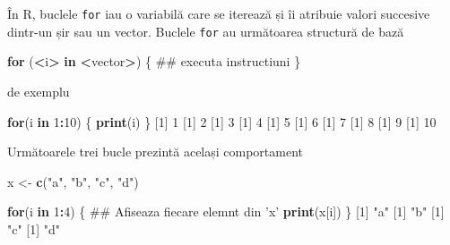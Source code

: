 \documentclass[]{article}
\newenvironment{Shaded}{\begin{snugshade}}{\end{snugshade}}
\newcommand{\KeywordTok}[1]{\textcolor[rgb]{0.13,0.29,0.53}{\textbf{#1}}}
\newcommand{\DecValTok}[1]{\textcolor[rgb]{0.00,0.00,0.81}{#1}}
\newcommand{\StringTok}[1]{\textcolor[rgb]{0.31,0.60,0.02}{#1}}
\newcommand{\ControlFlowTok}[1]{\textcolor[rgb]{0.13,0.29,0.53}{\textbf{#1}}}
\newcommand{\OperatorTok}[1]{\textcolor[rgb]{0.81,0.36,0.00}{\textbf{#1}}}
\newcommand{\NormalTok}[1]{#1}
\begin{document}
În R, buclele \texttt{for} iau o variabilă care se iterează și îi
atribuie valori succesive dintr-un șir sau un vector. Buclele
\texttt{for} au următoarea structură de bază

\begin{Shaded}
\begin{Highlighting}[]
\ControlFlowTok{for}\NormalTok{ (}\OperatorTok{<}\NormalTok{i}\OperatorTok{>}\StringTok{ }\ControlFlowTok{in} \OperatorTok{<}\NormalTok{vector}\OperatorTok{>}\NormalTok{) \{}
\NormalTok{        ## executa instructiuni}
\NormalTok{\} }
\end{Highlighting}
\end{Shaded}

de exemplu

\begin{Shaded}
\begin{Highlighting}[]
\ControlFlowTok{for}\NormalTok{(i }\ControlFlowTok{in} \DecValTok{1}\OperatorTok{:}\DecValTok{10}\NormalTok{) \{}
        \KeywordTok{print}\NormalTok{(i)}
\NormalTok{\}}
\NormalTok{[}\DecValTok{1}\NormalTok{] }\DecValTok{1}
\NormalTok{[}\DecValTok{1}\NormalTok{] }\DecValTok{2}
\NormalTok{[}\DecValTok{1}\NormalTok{] }\DecValTok{3}
\NormalTok{[}\DecValTok{1}\NormalTok{] }\DecValTok{4}
\NormalTok{[}\DecValTok{1}\NormalTok{] }\DecValTok{5}
\NormalTok{[}\DecValTok{1}\NormalTok{] }\DecValTok{6}
\NormalTok{[}\DecValTok{1}\NormalTok{] }\DecValTok{7}
\NormalTok{[}\DecValTok{1}\NormalTok{] }\DecValTok{8}
\NormalTok{[}\DecValTok{1}\NormalTok{] }\DecValTok{9}
\NormalTok{[}\DecValTok{1}\NormalTok{] }\DecValTok{10}
\end{Highlighting}
\end{Shaded}

Următoarele trei bucle prezintă același comportament

\begin{Shaded}
\begin{Highlighting}[]
\NormalTok{x <-}\StringTok{ }\KeywordTok{c}\NormalTok{(}\StringTok{"a"}\NormalTok{, }\StringTok{"b"}\NormalTok{, }\StringTok{"c"}\NormalTok{, }\StringTok{"d"}\NormalTok{)}

\ControlFlowTok{for}\NormalTok{(i }\ControlFlowTok{in} \DecValTok{1}\OperatorTok{:}\DecValTok{4}\NormalTok{) \{}
\NormalTok{        ## Afiseaza fiecare elemnt din 'x'}
        \KeywordTok{print}\NormalTok{(x[i])  }
\NormalTok{\}}
\NormalTok{[}\DecValTok{1}\NormalTok{] }\StringTok{"a"}
\NormalTok{[}\DecValTok{1}\NormalTok{] }\StringTok{"b"}
\NormalTok{[}\DecValTok{1}\NormalTok{] }\StringTok{"c"}
\NormalTok{[}\DecValTok{1}\NormalTok{] }\StringTok{"d"}
\end{Highlighting}
\end{Shaded}
\end{document}
